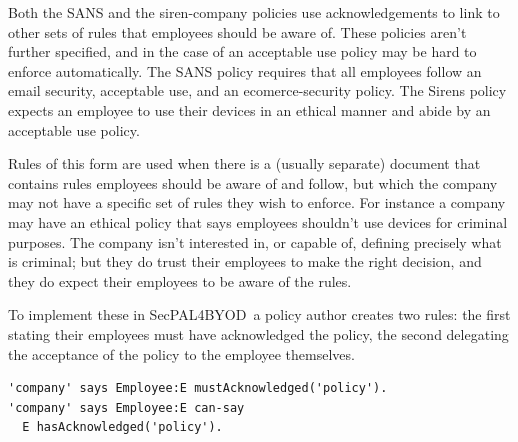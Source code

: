 \documentclass{llncs}
\newcommand{\AppPAL}[0]{SecPAL4BYOD}
\newenvironment{policyrule}[1]{%
  \begin{mdframed}\footnotesize
      \noindent\textbf{\sffamily #1}:~\itshape%
}{%
  \end{mdframed}
}
\begin{document}
Both the SANS and the siren-company policies use acknowledgements to link to other sets of rules that employees should be aware of.
These policies aren't further specified, and in the case of an acceptable use policy may be hard to enforce automatically.
The SANS policy requires that all employees follow an email security, acceptable use, and an ecomerce-security policy.
The Sirens policy expects an employee to use their devices in an ethical manner and abide by an acceptable use policy.

Rules of this form are used when there is a (usually separate) document that contains rules employees should be aware of and follow, but which the company may not have a specific set of rules they wish to enforce.
For instance a company may have an ethical policy that says employees shouldn't use devices for criminal purposes.
The company isn't interested in, or capable of, defining precisely what is criminal;
  but they do trust their employees to make the right decision, and they do expect their employees to be aware of the rules.

To implement these in \AppPAL~a policy author creates two rules: 
  the first stating their employees must have acknowledged the policy,
  the second delegating the acceptance of the policy to the employee themselves.
\begin{lstlisting}
'company' says Employee:E mustAcknowledged('policy').
'company' says Employee:E can-say
  E hasAcknowledged('policy').
\end{lstlisting}
\end{document}
